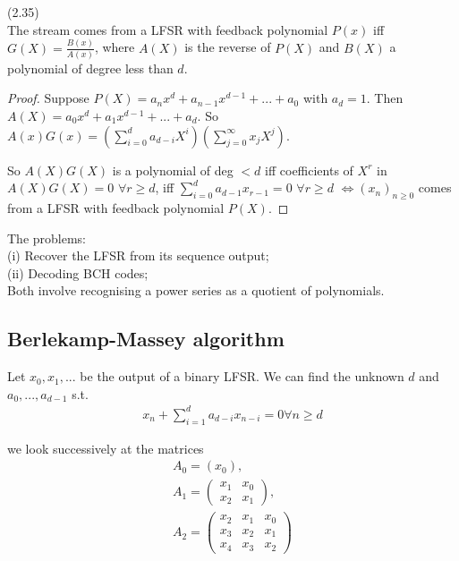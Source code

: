 \documentclass[a4paper]{article}
\begin{document}
\begin{thm} (2.35)\\
The stream comes from a LFSR with feedback polynomial $P(x)$ iff $G(X) = \frac{B(x)}{A(x)}$, where $A(X)$ is the reverse of $P(X)$ and $B(X)$ a polynomial of degree less than $d$.
\begin{proof}
Suppose $P(X) = a_n x^d + a_{n-1} x^{d-1} + ... + a_0$ with $a_d = 1$. Then $A(X) = a_0 x^d + a_1 x^{d-1} + ... + a_d$. So $A(x)G(x) = (\sum_{i=0}^d a_{d-i}X^i)(\sum_{j=0}^\infty x_j X^j)$.

So $A(X)G(X)$ is a polynomial of deg $<d$ iff coefficients of $X^r$ in $A(X)G(X) = 0$ $\forall r \geq d$, iff $\sum_{i=0}^d a_{d-1} x_{r-1} = 0$ $\forall r \geq d$ $\iff (x_n)_{n \geq 0}$ comes from a LFSR with feedback polynomial $P(X)$.
\end{proof}
\end{thm}

\begin{rem}
The problems:\\
(i) Recover the LFSR from its sequence output;\\
(ii) Decoding BCH codes;\\
Both involve recognising a power series as a quotient of polynomials.
\end{rem}

\subsection{Berlekamp-Massey algorithm}
Let $x_0,x_1,...$ be the output of a binary LFSR. We can find the unknown $d$ and $a_0,...,a_{d-1}$ s.t.
\begin{equation*}
\begin{aligned}
x_n + \sum_{i=1}^d a_{d-i} x_{n-i} = 0 \forall n \geq d
\end{aligned}
\end{equation*}

we look successively at the matrices
\begin{equation*}
\begin{aligned}
A_0 = (x_0),\\
A_1 = \begin{pmatrix}
x_1 & x_0\\
x_2 & x_1
\end{pmatrix},\\
A_2 =\begin{pmatrix}
x_2 & x_1 & x_0\\
x_3 & x_2 & x_1\\
x_4 & x_3 & x_2
\end{pmatrix}
\end{aligned}
\end{equation*}
\end{document}
